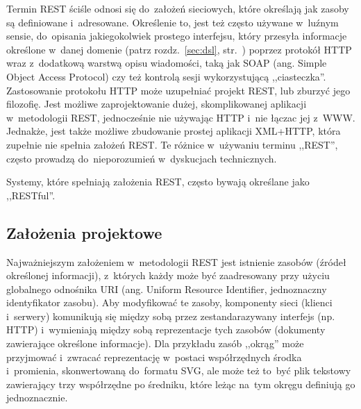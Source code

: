 \documentclass[a4paper,12pt,oneside]{report}
\begin{document}
Termin REST ściśle odnosi się do~założeń sieciowych, które określają jak zasoby są definiowane i~adresowane. Określenie to, jest też często używane w~luźnym sensie, do~opisania jakiegokolwiek prostego interfejsu, który przesyła informacje określone w~danej domenie (patrz rozdz.~\ref{sec:dsl}, str.~\pageref{sec:dsl}) poprzez protokół HTTP wraz z~dodatkową warstwą opisu wiadomości, taką jak SOAP (ang. Simple Object Access Protocol) czy też kontrolą sesji wykorzystującą ,,ciasteczka''. Zastosowanie protokołu HTTP może uzupełniać projekt REST, lub zburzyć jego filozofię. Jest możliwe zaprojektowanie dużej, skomplikowanej aplikacji w~metodologii REST, jednocześnie nie używając HTTP i~nie łączac jej z~WWW. Jednakże, jest także możliwe zbudowanie prostej aplikacji XML+HTTP, która zupełnie nie spełnia założeń REST. Te różnice w~używaniu terminu ,,REST'', często prowadzą do~nieporozumień w~dyskucjach technicznych.

Systemy, które spełniają założenia REST, często bywają określane jako ,,RESTful''.

\subsection{Założenia projektowe}
\label{sub:rest-zalozenia}
Najważniejszym założeniem w~metodologii REST jest istnienie zasobów (źródeł określonej informacji), z~których każdy może być zaadresowany przy użyciu globalnego odnośnika URI (ang. Uniform Resource Identifier, jednoznaczny identyfikator zasobu). Aby modyfikować te zasoby, komponenty sieci (klienci i~serwery) komunikują się między sobą przez zestandarazywany interfejs (np. HTTP) i~wymieniają między sobą reprezentacje tych zasobów (dokumenty zawierające określone informacje). Dla przykładu zasób ,,okrąg'' może przyjmować i~zwracać reprezentację w~postaci współrzędnych środka i~promienia, skonwertowaną do~formatu SVG, ale może też to~być plik tekstowy zawierający trzy współrzędne po średniku, które leżąc na~tym okręgu definiują go jednoznacznie.
\end{document}
